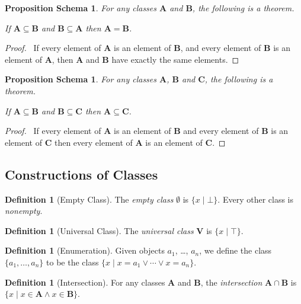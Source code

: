 \documentclass{book}
\let\qed\relax
\newtheorem{props}[ax]{Proposition Schema}
\theoremstyle{definition}
\newtheorem{df}[ax]{Definition}
\begin{document}
\begin{props}
For any classes $\mathbf{A}$ and $\mathbf{B}$, the following is a theorem.

If $\mathbf{A} \subseteq \mathbf{B}$ and $\mathbf{B} \subseteq \mathbf{A}$ then $\mathbf{A} = \mathbf{B}$.
\end{props}

\begin{proof}
\pf\ If every element of $\mathbf{A}$ is an element of $\mathbf{B}$, and every element of $\mathbf{B}$ is an element of $\mathbf{A}$, then $\mathbf{A}$ and $\mathbf{B}$ have exactly the same elements. \qed
\end{proof}

\begin{props}
For any classes $\mathbf{A}$, $\mathbf{B}$ and $\mathbf{C}$, the following is a theorem.

If $\mathbf{A} \subseteq \mathbf{B}$ and $\mathbf{B} \subseteq \mathbf{C}$ then $\mathbf{A} \subseteq \mathbf{C}$.
\end{props}

\begin{proof}
\pf\ If every element of $\mathbf{A}$ is an element of $\mathbf{B}$ and every element of $\mathbf{B}$ is an element of $\mathbf{C}$ then every element of $\mathbf{A}$ is an element of $\mathbf{C}$. \qed
\end{proof}

\subsection{Constructions of Classes}

\begin{df}[Empty Class]
The \emph{empty class} $\emptyset$ is $\{ x \mid \bot \}$. Every other class is \emph{nonempty}.
\end{df}

\begin{df}[Universal Class]
The \emph{universal class} $\mathbf{V}$ is $\{ x \mid \top \}$.
\end{df}

\begin{df}[Enumeration]
Given objects $a_1$, \ldots, $a_n$, we define the class $\{ a_1, \ldots, a_n \}$ to be the class $\{ x \mid x = a_1 \vee \cdots \vee x = a_n \}$.
\end{df}

\begin{df}[Intersection]
For any classes $\mathbf{A}$ and $\mathbf{B}$, the \emph{intersection} $\mathbf{A} \cap \mathbf{B}$ is $\{ x \mid x \in \mathbf{A} \wedge x \in \mathbf{B}\}$.
\end{df}
\end{document}
